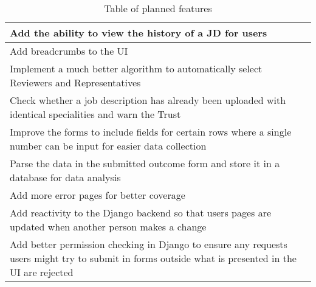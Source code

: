 \begin{table}[h!]
\begin{tabular}{||m{}||}
\hline
  Add the ability to view the history of a JD for users\\ 
\hline
 Add breadcrumbs to the UI\\ 
\hline
  Implement a much better algorithm to automatically select Reviewers and Representatives\\ 
\hline
  Check whether a job description has already been uploaded with identical specialities and warn the Trust\\ 
\hline
  Improve the forms to include fields for certain rows where a single number can be input for easier data collection\\ 
\hline
  Parse the data in the submitted outcome form and store it in a database for data analysis\\ 
\hline
  Add more error pages for better coverage\\ 
\hline
  Add reactivity to the Django backend so that users pages are updated when another person makes a change\\ 
\hline
  Add better permission checking in Django to ensure any requests users might try to submit in forms outside what is presented in the UI are rejected\\ [1ex]
 \hline
\end{tabular}
\vspace{-5pt}
\caption{Table of planned features}
\label{table:1}
\end{table}